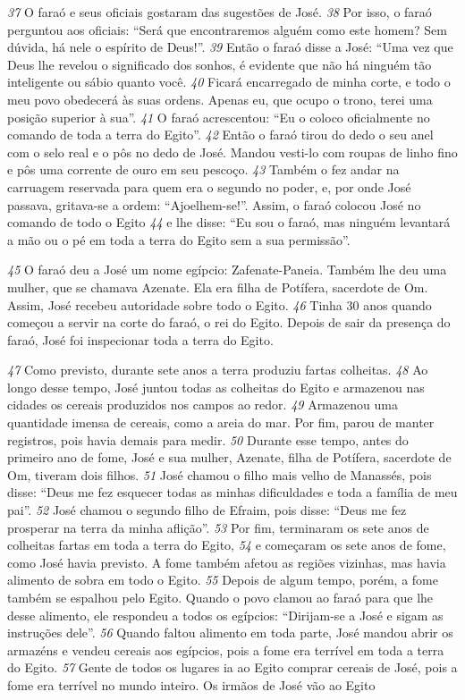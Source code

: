 \bigskip   
\textit{\tiny 37}
O  faraó e seus oficiais gostaram das sugestões de José. 
\textit{\tiny 38}
Por isso, o faraó
perguntou aos oficiais: “Será que encontraremos alguém como este homem? Sem
dúvida, há nele o espírito de Deus!”. 
\textit{\tiny 39}
Então o faraó disse a José: “Uma vez que
Deus lhe revelou o significado dos sonhos, é evidente que não há ninguém tão
inteligente ou sábio quanto você. 
\textit{\tiny 40}
Ficará encarregado de minha corte, e todo o
meu povo obedecerá às suas ordens. Apenas eu, que ocupo o trono, terei uma
posição superior à sua”.
\textit{\tiny 41}
O faraó acrescentou: “Eu o coloco oficialmente no comando de toda a terra
do Egito”. 
\textit{\tiny 42}
Então o faraó tirou do dedo o seu anel com o selo real e o pôs no dedo
de José. Mandou vesti-lo com roupas de linho fino e pôs uma corrente de ouro em
seu pescoço. 
\textit{\tiny 43}
Também o fez andar na carruagem reservada para quem era o
segundo no poder, e, por onde José passava, gritava-se a ordem: “Ajoelhem-se!”.
Assim, o faraó colocou José no comando de todo o Egito 
\textit{\tiny 44}
e lhe disse: “Eu sou o
faraó, mas ninguém levantará a mão ou o pé em toda a terra do Egito sem a sua
permissão”.

\bigskip   
\textit{\tiny 45}
O faraó deu a José um nome egípcio: Zafenate-Paneia.
 Também lhe deu
uma mulher, que se chamava Azenate. Ela era filha de Potífera, sacerdote de
Om. Assim, José recebeu autoridade sobre todo o Egito. 
\textit{\tiny 46}
Tinha 30 anos
quando começou a servir na corte do faraó, o rei do Egito. Depois de sair da
presença do faraó, José foi inspecionar toda a terra do Egito.

\bigskip   
\textit{\tiny 47}
Como previsto, durante sete anos a terra produziu fartas colheitas. 
\textit{\tiny 48}
Ao
longo desse tempo, José juntou todas as colheitas do Egito e armazenou nas
cidades os cereais produzidos nos campos ao redor. 
\textit{\tiny 49}
Armazenou uma
quantidade imensa de cereais, como a areia do mar. Por fim, parou de manter
registros, pois havia demais para medir.
\textit{\tiny 50}
Durante esse tempo, antes do primeiro ano de fome, José e sua mulher,
Azenate, filha de Potífera, sacerdote de Om, tiveram dois filhos. 
\textit{\tiny 51}
José chamou o
filho mais velho de Manassés,
 pois disse: “Deus me fez esquecer todas as
minhas dificuldades e toda a família de meu pai”. 
\textit{\tiny 52}
José chamou o segundo filho
de Efraim,
 pois disse: “Deus me fez prosperar na terra da minha aflição”.
\textit{\tiny 53}
Por fim, terminaram os sete anos de colheitas fartas em toda a terra do Egito,
\textit{\tiny 54}
e começaram os sete anos de fome, como José havia previsto. A fome também
afetou as regiões vizinhas, mas havia alimento de sobra em todo o Egito. 
\textit{\tiny 55}
Depois
de algum tempo, porém, a fome também se espalhou pelo Egito. Quando o povo
clamou ao faraó para que lhe desse alimento, ele respondeu a todos os egípcios:
“Dirijam-se a José e sigam as instruções dele”. 
\textit{\tiny 56}
Quando faltou alimento em toda
parte, José mandou abrir os armazéns e vendeu cereais aos egípcios, pois a fome
era terrível em toda a terra do Egito. 
\textit{\tiny 57}
Gente de todos os lugares ia ao Egito
comprar cereais de José, pois a fome era terrível no mundo inteiro.
Os irmãos de José vão ao Egito

